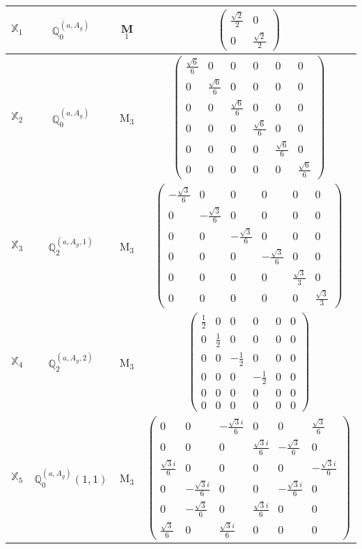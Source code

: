 \documentclass[fleqn,10pt,landscape]{article}
\begin{document}
\begin{itemize}
\begin{center}
\begin{longtable}{c|c|c|c}
$ \mathbb{X}_{1} $ & $\mathbb{Q}_{0}^{(a,A_{g})}$ & M$_{1}$ & $\begin{pmatrix} \frac{\sqrt{2}}{2} & 0 \\ 0 & \frac{\sqrt{2}}{2} \end{pmatrix}$ \\ \hline
$ \mathbb{X}_{2} $ & $\mathbb{Q}_{0}^{(a,A_{g})}$ & M$_{3}$ & $\begin{pmatrix} \frac{\sqrt{6}}{6} & 0 & 0 & 0 & 0 & 0 \\ 0 & \frac{\sqrt{6}}{6} & 0 & 0 & 0 & 0 \\ 0 & 0 & \frac{\sqrt{6}}{6} & 0 & 0 & 0 \\ 0 & 0 & 0 & \frac{\sqrt{6}}{6} & 0 & 0 \\ 0 & 0 & 0 & 0 & \frac{\sqrt{6}}{6} & 0 \\ 0 & 0 & 0 & 0 & 0 & \frac{\sqrt{6}}{6} \end{pmatrix}$ \\
$ \mathbb{X}_{3} $ & $\mathbb{Q}_{2}^{(a,A_{g},1)}$ & M$_{3}$ & $\begin{pmatrix} - \frac{\sqrt{3}}{6} & 0 & 0 & 0 & 0 & 0 \\ 0 & - \frac{\sqrt{3}}{6} & 0 & 0 & 0 & 0 \\ 0 & 0 & - \frac{\sqrt{3}}{6} & 0 & 0 & 0 \\ 0 & 0 & 0 & - \frac{\sqrt{3}}{6} & 0 & 0 \\ 0 & 0 & 0 & 0 & \frac{\sqrt{3}}{3} & 0 \\ 0 & 0 & 0 & 0 & 0 & \frac{\sqrt{3}}{3} \end{pmatrix}$ \\
$ \mathbb{X}_{4} $ & $\mathbb{Q}_{2}^{(a,A_{g},2)}$ & M$_{3}$ & $\begin{pmatrix} \frac{1}{2} & 0 & 0 & 0 & 0 & 0 \\ 0 & \frac{1}{2} & 0 & 0 & 0 & 0 \\ 0 & 0 & - \frac{1}{2} & 0 & 0 & 0 \\ 0 & 0 & 0 & - \frac{1}{2} & 0 & 0 \\ 0 & 0 & 0 & 0 & 0 & 0 \\ 0 & 0 & 0 & 0 & 0 & 0 \end{pmatrix}$ \\
$ \mathbb{X}_{5} $ & $\mathbb{Q}_{0}^{(a,A_{g})}(1,1)$ & M$_{3}$ & $\begin{pmatrix} 0 & 0 & - \frac{\sqrt{3} i}{6} & 0 & 0 & \frac{\sqrt{3}}{6} \\ 0 & 0 & 0 & \frac{\sqrt{3} i}{6} & - \frac{\sqrt{3}}{6} & 0 \\ \frac{\sqrt{3} i}{6} & 0 & 0 & 0 & 0 & - \frac{\sqrt{3} i}{6} \\ 0 & - \frac{\sqrt{3} i}{6} & 0 & 0 & - \frac{\sqrt{3} i}{6} & 0 \\ 0 & - \frac{\sqrt{3}}{6} & 0 & \frac{\sqrt{3} i}{6} & 0 & 0 \\ \frac{\sqrt{3}}{6} & 0 & \frac{\sqrt{3} i}{6} & 0 & 0 & 0 \end{pmatrix}$ \\

\end{longtable}
\end{center}
\end{itemize}
\end{document}
